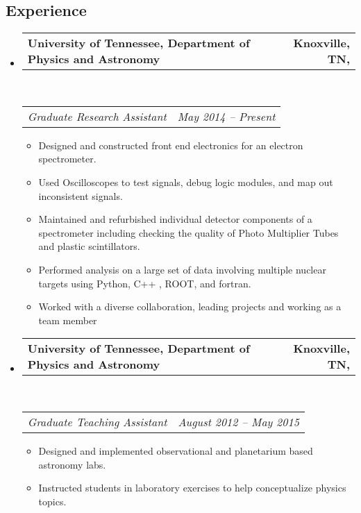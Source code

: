 \documentclass[12pt,letterpaper]{article}
\makeatletter
\newcommand{\headerrow}[2]
{\begin{tabular*}{\linewidth}{l@{\extracolsep{\fill}}r}
	#1 &
	#2 \\
\end{tabular*}}
\makeatother
\begin{document}
\subsection*{Experience}

\begin{itemize}
	\parskip=0.1em

	\item
	\headerrow
		{\textbf{University of Tennessee, Department of Physics and Astronomy }}
		{\textbf{  Knoxville, TN,}}
	\\
	\headerrow
		{\emph{Graduate Research Assistant }}
		{\emph{May 2014 -- Present}}
	\begin{itemize}
			\itemsep0em
			\item Designed and constructed front end electronics for an electron spectrometer.
			\item Used Oscilloscopes to test signals, debug logic modules, and map out inconsistent signals.  
			\item Maintained and refurbished individual detector components of a spectrometer including checking the quality of Photo Multiplier Tubes and plastic scintillators.
			\item Performed analysis on a large set of data involving multiple nuclear targets using Python, C++ , ROOT, and fortran. 
			\item Worked with a diverse collaboration, leading projects and working as a team member
	\end{itemize}
	\item
	\headerrow
		{\textbf{University of Tennessee, Department of Physics and Astronomy }}
		{\textbf{  Knoxville, TN,}}
	\\
	\headerrow
		{\emph{Graduate Teaching Assistant }}
		{\emph{August 2012 -- May 2015}}
	\begin{itemize}
		\item Designed and implemented observational and planetarium based astronomy labs.
		\item Instructed students in laboratory exercises to help conceptualize physics topics.
	\end{itemize}
\end{itemize}
\end{document}
